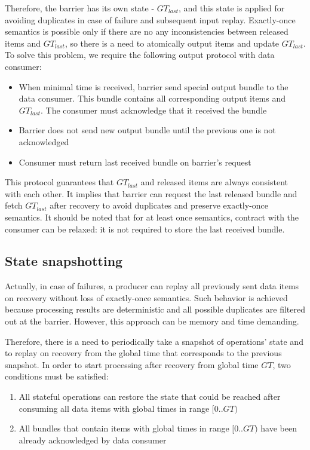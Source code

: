 Therefore, the barrier has its own state - $GT_{last}$, and this state is applied for avoiding duplicates in case of failure and subsequent input replay. Exactly-once semantics is possible only if there are no any inconsistencies between released items and $GT_{last}$, so there is a need to atomically output items and update $GT_{last}$. To solve this problem, we require the following output protocol with data consumer:

\begin{itemize}
    \item When minimal time is received, barrier send special output bundle to the data consumer. This bundle contains all corresponding output items and $GT_{last}$. The consumer must acknowledge that it received the bundle
    \item Barrier does not send new output bundle until the previous one is not acknowledged
    \item Consumer must return last received bundle on barrier's request 
\end{itemize}

This protocol guarantees that $GT_{last}$ and released items are always consistent with each other. It implies that barrier can request the last released bundle and fetch $GT_{last}$ after recovery to avoid duplicates and preserve exactly-once semantics. It should be noted that for at least once semantics, contract with the consumer can be relaxed: it is not required to store the last received bundle.

\subsection{State snapshotting}
Actually, in case of failures, a producer can replay all previously sent data items on recovery without loss of exactly-once semantics. Such behavior is achieved because processing results are deterministic and all possible duplicates are filtered out at the barrier. However, this approach can be memory and time demanding. 

Therefore, there is a need to periodically take a snapshot of operations' state and to replay on recovery from the global time that corresponds to the previous snapshot. In order to start processing after recovery from global time $GT$, two conditions must be satisfied:
\begin{enumerate}
    \item All stateful operations can restore the state that could be reached after consuming all data items with global times in range $[0..GT)$ 
    \item All bundles that contain items with global times in range $[0..GT)$ have been already acknowledged by data consumer 
\end{enumerate}

